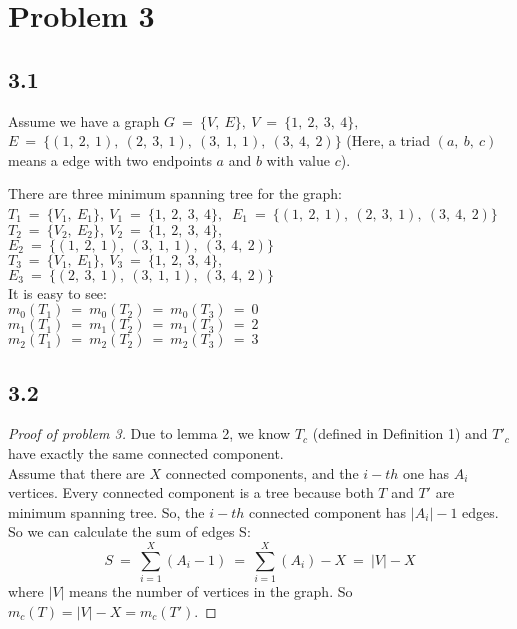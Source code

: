\documentclass[paper=a4, fontsize=11pt]{scrartcl} %
\numberwithin{figure}{section} %
\numberwithin{table}{section} %
\begin{document}

\section*{Problem 3}
\subsection*{3.1}
Assume we have a graph
$G~=~\{V,~E\},~V~=~\{1,~2,~3,~4\},~$ $E~=~\{(1,~2,~1),~(2,~3,~1),~(3,~1,~1),~(3,~4,~2)\}$ (Here, a triad $(a,~b,~c)$ means a edge with two endpoints $a$ and $b$ with value $c$).

There are three minimum spanning tree for the graph:\\
$T_1~=~\{V_1,~E_1\},~V_1~=~\{1,~2,~3,~4\},~$
$E_1~=~\{(1,~2,~1),~(2,~3,~1),~(3,~4,~2)\}$\\
$T_2~=~\{V_2,~E_2\},~V_2~=~\{1,~2,~3,~4\},~$\\
$E_2~=~\{(1,~2,~1),~(3,~1,~1),~(3,~4,~2)\}$\\
$T_3~=~\{V_1,~E_1\},~V_3~=~\{1,~2,~3,~4\},~$\\
$E_3~=~\{(2,~3,~1),~(3,~1,~1),~(3,~4,~2)\}$\\
It is easy to see:\\
$m_0(T_1)~=~m_0(T_2)~=~m_0(T_3)~=~0$\\
$m_1(T_1)~=~m_1(T_2)~=~m_1(T_3)~=~2$\\
$m_2(T_1)~=~m_2(T_2)~=~m_2(T_3)~=~3$\\

\subsection*{3.2}
\begin{proof}[Proof of problem 3]
Due to lemma 2, we know $T_c$ (defined in Definition 1) and $T'_c$ have exactly the same connected component. \\
Assume that there are $X$ connected components, and the $i-th$ one has $A_i$ vertices. Every connected component is a tree because both $T$ and $T'$ are minimum spanning tree. So, the $i-th$ connected component has $|A_i|-1$ edges. So we can calculate the sum of edges S:
\begin{equation}
S~=~\sum_{i=1}^{X}(A_i-1)~=~\sum_{i=1}^{X}(A_i)-X~=~|V|-X
\end{equation}
where $|V|$ means the number of vertices in the graph. So $m_c(T) = |V| - X = m_c(T')$.

\end{proof}
\end{document}
